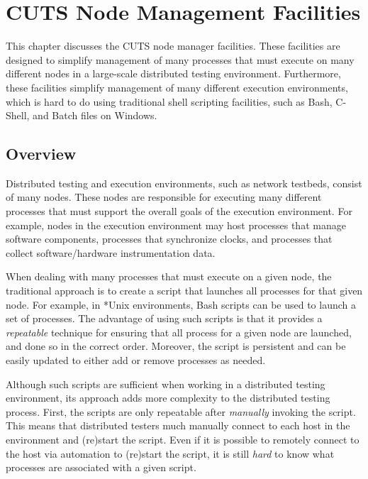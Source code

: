 
\chapter{CUTS Node Management Facilities}
\label{chap:node}

This chapter discusses the CUTS node manager facilities. These
facilities are designed to simplify management of many processes
that must execute on many different nodes in a large-scale distributed
testing environment. Furthermore, these facilities simplify management
of many different execution environments, which is hard to do using 
traditional shell scripting facilities, such as Bash, C-Shell, and
Batch files on Windows.

\section{Overview}
\label{sec:node-overview}

Distributed testing and execution environments, such as network 
testbeds, consist of many nodes. These nodes are responsible for 
executing many different processes that must support the overall
goals of the execution environment. For example, nodes in the 
execution environment may host processes that manage software components,  
processes that synchronize clocks, and processes that collect
software/hardware instrumentation data.

When dealing with many processes that must execute on a given node,
the traditional approach is to create a script that launches all
processes for that given node. For example, in *Unix environments,
Bash scripts can be used to launch a set of processes. The advantage
of using such scripts is that it provides a \textit{repeatable}
technique for ensuring that all process for a given node are launched,
and done so in the correct order. Moreover, the script is persistent
and can be easily updated to either add or remove processes as needed.

Although such scripts are sufficient when working in a distributed 
testing environment, its approach adds more complexity to the 
distributed testing process. First, the scripts are only repeatable
after \textit{manually} invoking the script. This means that 
distributed testers much manually connect to each host in the 
environment and (re)start the script. Even if it is possible to 
remotely connect to the host via automation to (re)start the 
script, it is still \textit{hard} to know what processes are
associated with a given script.

